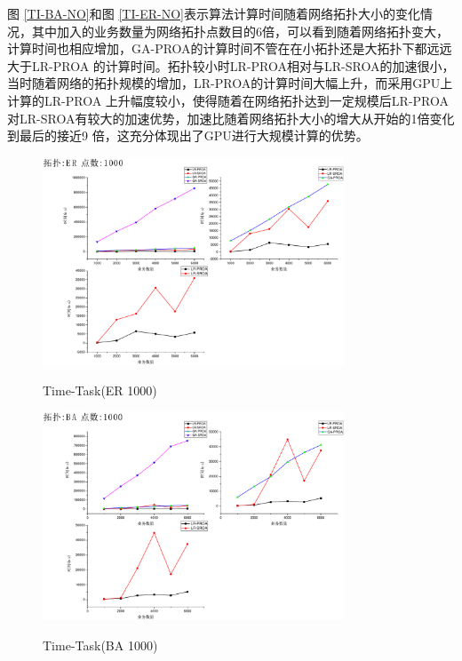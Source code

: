 图 \ref{TI-BA-NO}和图 \ref{TI-ER-NO}表示算法计算时间随着网络拓扑大小的变化情况，其中加入的业务数量为网络拓扑点数目的6倍，可以看到随着网络拓扑变大，计算时间也相应增加，GA-PROA的计算时间不管在在小拓扑还是大拓扑下都远远大于LR-PROA 的计算时间。拓扑较小时LR-PROA相对与LR-SROA的加速很小，当时随着网络的拓扑规模的增加，LR-PROA的计算时间大幅上升，而采用GPU上计算的LR-PROA 上升幅度较小，使得随着在网络拓扑达到一定规模后LR-PROA对LR-SROA有较大的加速优势，加速比随着网络拓扑大小的增大从开始的1倍变化到最后的接近9 倍，这充分体现出了GPU进行大规模计算的优势。
\begin{figure}
\setlength{\belowcaptionskip}{-0.1cm}
\begin{center}
{\includegraphics[width=0.8\textwidth]{figures/TI-ER-TA-1000.pdf}}
\end{center}
\caption{{\footnotesize{Time-Task(ER 1000)}}}
\label{TI-ER-TA-1000}
\end{figure}
\begin{figure}
\setlength{\belowcaptionskip}{-0.1cm}
\begin{center}
{\includegraphics[width=0.8\textwidth]{figures/TI-BA-TA-1000.pdf}}
\end{center}
\caption{{\footnotesize{Time-Task(BA 1000)}}}
\label{TI-BA-TA-1000}
\end{figure}
